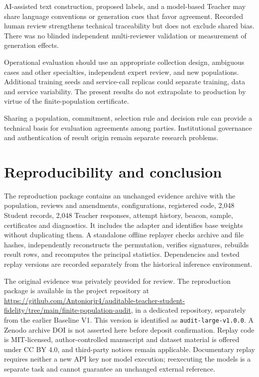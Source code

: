 \documentclass[
  10pt,
]{article}
\let\oldsection\section
\renewcommand{\section}{\needspace{5\baselineskip}\oldsection}
\begin{document}
AI-assisted text construction, proposed labels, and a model-based
Teacher may share language conventions or generation cues that favor
agreement. Recorded human review strengthens technical traceability but
does not exclude shared bias. There was no blinded independent
multi-reviewer validation or measurement of generation effects.

Operational evaluation should use an appropriate collection design,
ambiguous cases and other specialties, independent expert review, and
new populations. Additional training seeds and service-call replicas
could separate training, data and service variability. The present
results do not extrapolate to production by virtue of the
finite-population certificate.

Sharing a population, commitment, selection rule and decision rule can
provide a technical basis for evaluation agreements among parties.
Institutional governance and authentication of result origin remain
separate research problems.

\hypertarget{reproducibility-and-conclusion}{%
\section{Reproducibility and
conclusion}\label{reproducibility-and-conclusion}}

The reproduction package contains an unchanged evidence archive with the
population, reviews and amendments, configurations, registered code,
2,048 Student records, 2,048 Teacher responses, attempt history, beacon,
sample, certificates and diagnostics. It includes the adapter and
identifies base weights without duplicating them. A standalone offline
replayer checks archive and file hashes, independently reconstructs the
permutation, verifies signatures, rebuilds result rows, and recomputes
the principal statistics. Dependencies and tested replay versions are
recorded separately from the historical inference environment.

The original evidence was privately provided for review. The
reproduction package is available in the project repository at
\url{https://github.com/Antoniorjr4/auditable-teacher-student-fidelity/tree/main/finite-population-audit},
in a dedicated repository, separately from the earlier Baseline V1. This
version is identified as \texttt{audit-large-v1.0.0}. A Zenodo archive
DOI is not asserted here before deposit confirmation. Replay code is
MIT-licensed, author-controlled manuscript and dataset material is
offered under CC BY 4.0, and third-party notices remain applicable.
Documentary replay requires neither a new API key nor model execution;
reexecuting the models is a separate task and cannot guarantee an
unchanged external reference.
\end{document}
